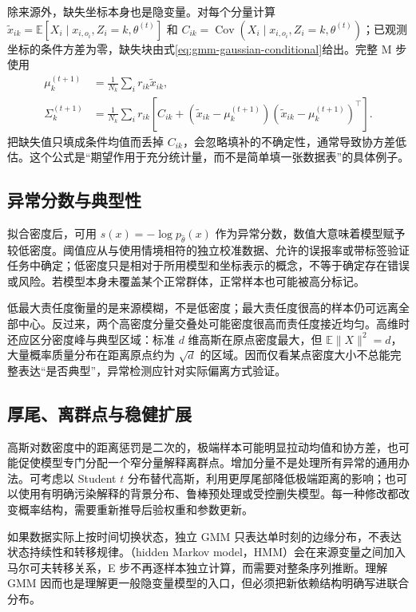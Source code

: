 \documentclass[UTF8]{ctexart}
\begin{document}
除来源外，缺失坐标本身也是隐变量。对每个分量计算 $\widetilde x_{ik}=\mathbb E[X_i\mid x_{i,o_i},Z_i=k,\theta^{(t)}]$ 和 $C_{ik}=\operatorname{Cov}(X_i\mid x_{i,o_i},Z_i=k,\theta^{(t)})$；已观测坐标的条件方差为零，缺失块由式\eqref{eq:gmm-gaussian-conditional}给出。完整 M 步使用
\begin{align}
\mu_k^{(t+1)}&=\frac1{N_k}\sum_i r_{ik}\widetilde x_{ik},\nonumber\\
\Sigma_k^{(t+1)}&=\frac1{N_k}\sum_i r_{ik}
\left[C_{ik}+(\widetilde x_{ik}-\mu_k^{(t+1)})(\widetilde x_{ik}-\mu_k^{(t+1)})^\top\right].
\label{eq:gmm-missing-update}
\end{align}
把缺失值只填成条件均值而丢掉 $C_{ik}$，会忽略填补的不确定性，通常导致协方差低估。这个公式是“期望作用于充分统计量，而不是简单填一张数据表”的具体例子。

\subsection{异常分数与典型性}
拟合密度后，可用 $s(x)=-\log p_{\widehat\theta}(x)$ 作为异常分数，数值大意味着模型赋予较低密度。阈值应从与使用情境相符的独立校准数据、允许的误报率或带标签验证任务中确定；低密度只是相对于所用模型和坐标表示的概念，不等于确定存在错误或风险。若模型本身未覆盖某个正常群体，正常样本也可能被高分标记。

低最大责任度衡量的是来源模糊，不是低密度；最大责任度很高的样本仍可远离全部中心。反过来，两个高密度分量交叠处可能密度很高而责任度接近均匀。高维时还应区分密度峰与典型区域：标准 $d$ 维高斯在原点密度最大，但 $\mathbb E\|X\|^2=d$，大量概率质量分布在距离原点约为 $\sqrt d$ 的区域。因而仅看某点密度大小不总能完整表达“是否典型”，异常检测应针对实际偏离方式验证。

\subsection{厚尾、离群点与稳健扩展}
高斯对数密度中的距离惩罚是二次的，极端样本可能明显拉动均值和协方差，也可能促使模型专门分配一个窄分量解释离群点。增加分量不是处理所有异常的通用办法。可考虑以 Student $t$ 分布替代高斯，利用更厚尾部降低极端距离的影响；也可以使用有明确污染解释的背景分布、鲁棒预处理或受控删失模型。每一种修改都改变概率结构，需要重新推导后验权重和参数更新。

如果数据实际上按时间切换状态，独立 GMM 只表达单时刻的边缘分布，不表达状态持续性和转移规律。（hidden Markov model，HMM）会在来源变量之间加入马尔可夫转移关系，E 步不再逐样本独立计算，而需要对整条序列推断。理解 GMM 因而也是理解更一般隐变量模型的入口，但必须把新依赖结构明确写进联合分布。
\end{document}
